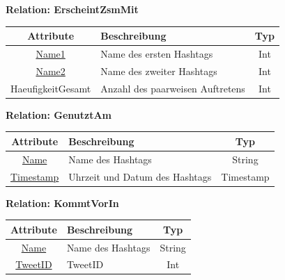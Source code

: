 \documentclass[a4paper ,8pt,x11names]{article}
\begin{document}
\begin{flushleft}
\begin{table}[!htb] 
\begin{center}
\textbf{Relation: ErscheintZsmMit}
\end{center}
 \begin{tabular}{|c|p{8cm}|c|}\hline
   \textbf{Attribute} & \textbf{Beschreibung} & \textbf{Typ} \\ \hline \hline
   \underline{Name1} & Name des ersten Hashtags & Int \\ \hline    
   \underline{Name2} & Name des zweiter Hashtags & Int \\ \hline    
   HaeufigkeitGesamt & Anzahl des paarweisen Auftretens & Int \\ \hline    
 \end{tabular}
\end{table}

\begin{table}[!htb] 
\begin{center}
\textbf{Relation: GenutztAm}
\end{center}
 \begin{tabular}{|c|p{8cm}|c|}\hline
   \textbf{Attribute} & \textbf{Beschreibung} & \textbf{Typ} \\ \hline \hline
   \underline{Name} & Name des Hashtags & String \\ \hline    
   \underline{Timestamp} & Uhrzeit und Datum des Hashtags & Timestamp \\ \hline    
 \end{tabular}
\end{table}

\begin{table}[!htb] 
\begin{center}
\textbf{Relation: KommtVorIn}
\end{center}
 \begin{tabular}{|c|p{8cm}|c|}\hline
   \textbf{Attribute} & \textbf{Beschreibung} & \textbf{Typ} \\ \hline \hline
   \underline{Name} & Name des Hashtags & String \\ \hline    
   \underline{TweetID} & TweetID & Int \\ \hline    
 \end{tabular}
\end{table}
\end{flushleft}
\end{document}
